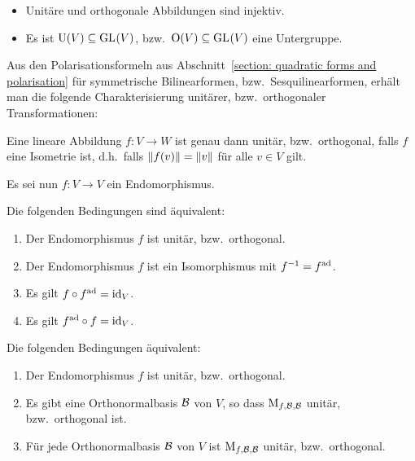 \begin{lemma}
  \label{lemma: properties of unitary and orthogonal transformations}
  \begin{itemize}
    \item
      Unitäre und orthogonale Abbildungen sind injektiv.
    \item
      Es ist $\operatorname{U}(V) \subseteq \operatorname{GL}_{}(V)$, bzw.\ $\operatorname{O}(V) \subseteq \operatorname{GL}_{}(V)$ eine Untergruppe.
  \end{itemize}
\end{lemma}

Aus den Polarisationsformeln aus Abschnitt~\ref{section: quadratic forms and polarisation} für symmetrische Bilinearformen, bzw.\ Sesquilinearformen, erhält man die folgende Charakterisierung unitärer, bzw.\ orthogonaler Transformationen:

\begin{lemma}
  Eine lineare Abbildung $f \colon V \to W$ ist genau dann unitär, bzw.\ orthogonal, falls $f$ eine Isometrie ist, d.h.\ falls $\left\|  f(v)  \right\| = \left\| v \right\|$ für alle $v \in V$ gilt.
\end{lemma}

Es sei nun $f \colon V \to V$ ein Endomorphismus.

\begin{lemma}
  Die folgenden Bedingungen sind äquivalent:
  \begin{enumerate}
    \item
      Der Endomorphismus $f$ ist unitär, bzw.\ orthogonal.
    \item
      Der Endomorphismus $f$ ist ein Isomorphismus mit $f^{-1} = f^{\operatorname{ad}}$.
    \item
      Es gilt $f \circ f^{\operatorname{ad}} = \operatorname{id}_V$.
    \item
      Es gilt $f^{\operatorname{ad}} \circ f = \operatorname{id}_V$.
  \end{enumerate}
\end{lemma}

\begin{lemma}
  Die folgenden Bedingungen äquivalent:
  \begin{enumerate}
    \item
      Der Endomorphismus $f$ ist unitär, bzw.\ orthogonal.
    \item
      Es gibt eine Orthonormalbasis $\mathcal{B}$ von $V$, so dass $\operatorname{M}_{f, \mathcal{B}, \mathcal{B}}$ unitär, bzw.\ orthogonal ist.
    \item
      Für jede Orthonormalbasis $\mathcal{B}$ von $V$ ist $\operatorname{M}_{f, \mathcal{B}, \mathcal{B}}$ unitär, bzw.\ orthogonal.
  \end{enumerate}
\end{lemma}




